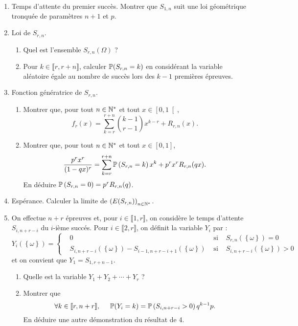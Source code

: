 \begin{enumerate}
  \item Temps d'attente du premier succès. 
Montrer que $S_{1,n}$ suit une loi géométrique tronquée de paramètres $n+1$ et $p$.

  \item Loi de $S_{r,n}$.
  \begin{enumerate}
    \item Quel est l'ensemble $S_{r,n}(\Omega)$ ?
    \item Pour $k \in \llbracket r, r + n \rrbracket$,  calculer $\mathbb{P}(S_{r,n} = k)$ en considérant la variable aléatoire égale au nombre de succès lors des $k-1$ premières épreuves.
  \end{enumerate}
  
  \item Fonction génératrice de $S_{r,n}$.
  \begin{enumerate}
    \item Montrer que, pour tout $n\in \mathbb{N}^*$ et tout $x \in \left[0 , 1\right[$, 
\[
  f_r(x) = \sum_{k=r}^{r+n} \binom{k-1}{r-1}x^{k-r} + R_{r,n}(x).
\]

    \item Montrer que, pour tout $n\in \mathbb{N}^*$ et tout $x \in \left[0 , 1\right]$,
\[
  \frac{p^rx^r}{(1-qx)^r} = \sum_{k=r}^{r+n}\mathbb{P}\left(S_{r,n} = k\right)x^k + p^r x^r R_{r,n}(qx).
\]
En déduire $\mathbb{P}\left( S_{r,n} = 0\right) = p^r R_{r,n}(q)$.
  \end{enumerate}
  
  \item Espérance. Calculer la limite de $\left(E(S_{r,n})\right)_{n \in \mathbb{N}^*}$.
  
  \item On effectue $n + r$ épreuves et, pour $i \in \llbracket 1, r\rrbracket$, on considère le temps d'attente $S_{i,n+r-i}$ du $i$-ième succés. Pour $i \in \llbracket 2,r\rrbracket$, on définit la variable $Y_i$ par :
\[
  Y_i(\left\lbrace \omega \right\rbrace) =
  \left\lbrace
  \begin{aligned}
    &0 &\text{ si }& S_{r,n}(\left\lbrace \omega \right\rbrace)=0 \\
    &S_{i,n+r-i}(\left\lbrace \omega \right\rbrace) - S_{i-1,n+r-i+1}(\left\lbrace \omega \right\rbrace)&\text{ si }& S_{i,n+r-i}(\left\lbrace \omega \right\rbrace)>0
  \end{aligned}
  \right.
\]
et on convient que $Y_1 = S_{1,r+n-1}$.
\begin{enumerate}
  \item Quelle est la variable $Y_1 + Y_2 + \cdots + Y_r$ ?
  \item Montrer que 
\[
\forall k \in \llbracket r, n+r\rrbracket, \hspace{0.5cm}  \mathbb{P}(Y_i = k) = \mathbb{P}\left( S_{i,n+r-i} >0\right)q^{k-1}p. 
\]
En déduire une autre démonstration du résultat de 4.
\end{enumerate}


\end{enumerate}

